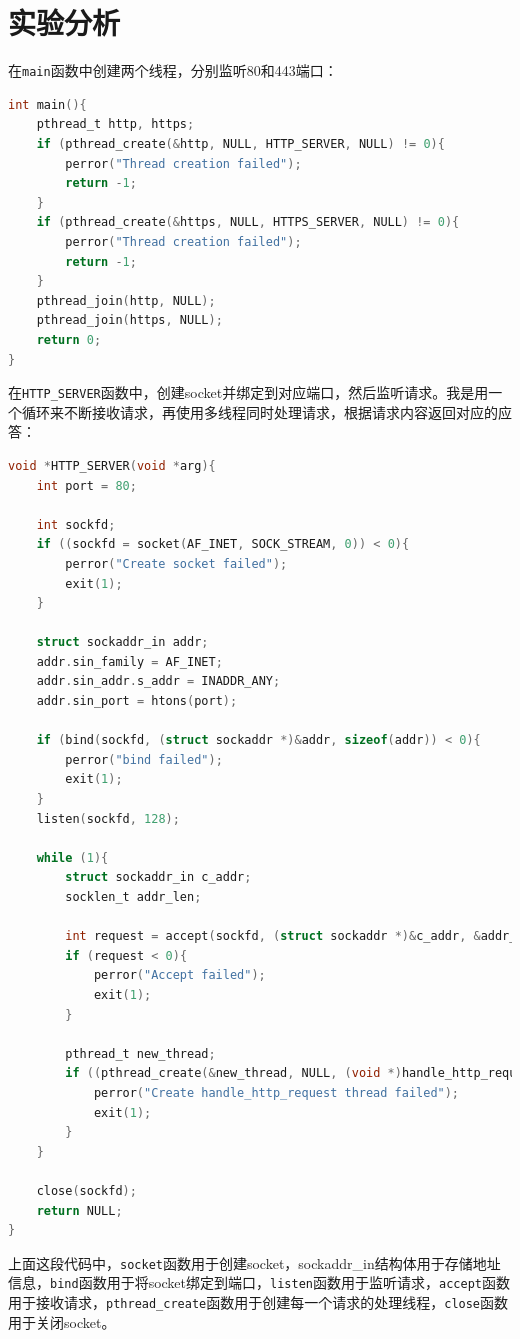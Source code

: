 \documentclass[UTF8]{article}
\begin{document}
\section{实验分析}

在\texttt{main}函数中创建两个线程，分别监听80和443端口：

\begin{lstlisting}[language=c]
int main(){   
    pthread_t http, https;
    if (pthread_create(&http, NULL, HTTP_SERVER, NULL) != 0){
        perror("Thread creation failed");
        return -1;
    }
    if (pthread_create(&https, NULL, HTTPS_SERVER, NULL) != 0){
        perror("Thread creation failed");
        return -1;
    }
    pthread_join(http, NULL);
    pthread_join(https, NULL);
    return 0;
}
\end{lstlisting}

在\texttt{HTTP\_SERVER}函数中，创建socket并绑定到对应端口，然后监听请求。我是用一个循环来不断接收请求，再使用多线程同时处理请求，根据请求内容返回对应的应答：

\begin{lstlisting}[language=c]
void *HTTP_SERVER(void *arg){   
    int port = 80;

    int sockfd;
    if ((sockfd = socket(AF_INET, SOCK_STREAM, 0)) < 0){
        perror("Create socket failed");
        exit(1);
    }

    struct sockaddr_in addr;
    addr.sin_family = AF_INET;
    addr.sin_addr.s_addr = INADDR_ANY;
    addr.sin_port = htons(port);

    if (bind(sockfd, (struct sockaddr *)&addr, sizeof(addr)) < 0){
        perror("bind failed");
        exit(1);
    }
    listen(sockfd, 128);

    while (1){
        struct sockaddr_in c_addr;
        socklen_t addr_len;

        int request = accept(sockfd, (struct sockaddr *)&c_addr, &addr_len);
        if (request < 0){
            perror("Accept failed");
            exit(1);
        }

        pthread_t new_thread;
        if ((pthread_create(&new_thread, NULL, (void *)handle_http_request, (void *)&request)) != 0){
            perror("Create handle_http_request thread failed");
            exit(1);
        }
    }

    close(sockfd);
    return NULL;
}
\end{lstlisting}

上面这段代码中，\texttt{socket}函数用于创建socket，sockaddr_in结构体用于存储地址信息，\texttt{bind}函数用于将socket绑定到端口，\texttt{listen}函数用于监听请求，\texttt{accept}函数用于接收请求，\texttt{pthread\_create}函数用于创建每一个请求的处理线程，\texttt{close}函数用于关闭socket。
\end{document}
